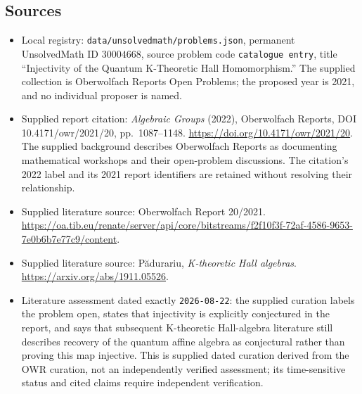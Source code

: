 \documentclass[11pt]{article}
\begin{document}
\subsection{Sources}
\begin{itemize}
\item Local registry: \texttt{data/unsolvedmath/problems.json}, permanent UnsolvedMath ID \(30004668\), source problem code \texttt{catalogue entry}, title ``Injectivity of the Quantum K-Theoretic Hall Homomorphism.'' The supplied collection is Oberwolfach Reports Open Problems; the proposed year is 2021, and no individual proposer is named.
\item Supplied report citation: \emph{Algebraic Groups} (2022), Oberwolfach Reports, DOI 10.4171/owr/2021/20, pp.\ 1087--1148. \url{https://doi.org/10.4171/owr/2021/20}. The supplied background describes Oberwolfach Reports as documenting mathematical workshops and their open-problem discussions. The citation's 2022 label and its 2021 report identifiers are retained without resolving their relationship.
\item Supplied literature source: Oberwolfach Report 20/2021. \url{https://oa.tib.eu/renate/server/api/core/bitstreams/f2f10f3f-72af-4586-9653-7e0b6b7e77c9/content}.
\item Supplied literature source: P\u{a}durariu, \emph{K-theoretic Hall algebras}. \url{https://arxiv.org/abs/1911.05526}.
\item Literature assessment dated exactly \texttt{2026-08-22}: the supplied curation labels the problem open, states that injectivity is explicitly conjectured in the report, and says that subsequent K-theoretic Hall-algebra literature still describes recovery of the quantum affine algebra as conjectural rather than proving this map injective. This is supplied dated curation derived from the OWR curation, not an independently verified assessment; its time-sensitive status and cited claims require independent verification.
\end{itemize}
\end{document}
